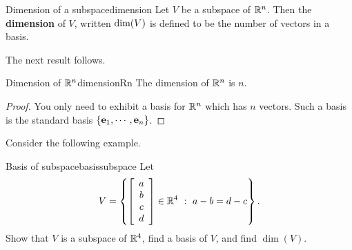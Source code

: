 \begin{definition}{Dimension of a subspace}{dimension}
Let $V$ be a subspace of $\mathbb{R}^{n}$. Then the \textbf{dimension }of $V$, written $\mbox{dim}(V)$
is defined to be the number of vectors in a basis.
\end{definition}

The next result follows.

\begin{corollary}{Dimension of $\mathbb{R}^n$}{dimensionRn}
The dimension of $\mathbb{R}^{n}$ is $n.$ 
\end{corollary}

\begin{proof}
You only need to exhibit a basis for $\mathbb{R}^{n}$ which
has $n$ vectors. Such a basis is the standard basis $\left\{ {\bf e}_{1},\cdots , {\bf e}_{n}\right\} $.
\end{proof}

Consider the following example.

\begin{example}{Basis of subspace}{basissubspace}
Let 
\[ V=\left\{
\left[\begin{array}{c} a\\ b\\ c\\ d\end{array}\right]\in\mathbb{R}^4
~:~ a-b=d-c \right\}.\]
Show that $V$ is a subspace of $\mathbb{R}^4$,
find a basis of $V$, and find $\dim(V)$.
\end{example}

